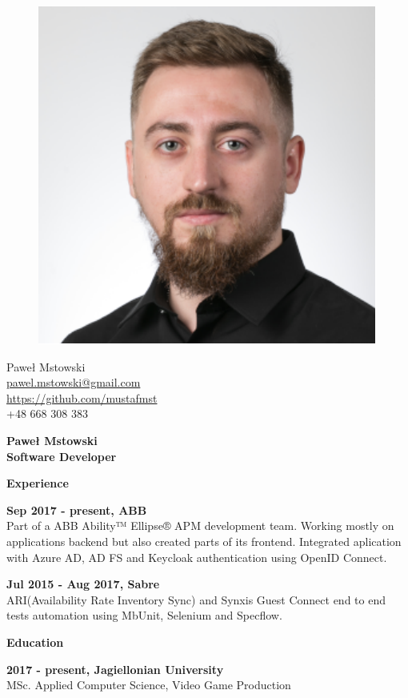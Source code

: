 \documentclass[a4paper,12pt,final]{memoir}
\newcommand{\Sep}{\vspace{1.5em}}
\newcommand{\SmallSep}{\vspace{0.5em}}
\newcommand{\CVSection}[1]
	{\Large\textbf{#1}\par
	\SmallSep\normalsize\normalfont}
\newcommand{\CVItem}[1]
	{\textbf{\color{RoyalBlue} #1}}
\begin{document}
\begin{figure}
	\hfill
	\includegraphics[width=0.6\columnwidth]{photo}
	\vspace{-7cm}
\end{figure}

\begin{flushright}\small
	Paweł Mstowski \\
	\url{pawel.mstowski@gmail.com}  \\
	\url{https://github.com/mustafmst} \\
	+48 668 308 383
\end{flushright}\normalsize
\framebreak


\Huge\bfseries {Paweł \color{RoyalBlue} Mstowski} \\
\Large\bfseries  Software Developer \\

\normalsize\normalfont

\CVSection{Experience}
\CVItem{Sep 2017 - present, ABB }\\
Part of a ABB Ability™ Ellipse® APM development team. Working mostly on applications backend but also created parts of its frontend. Integrated aplication with Azure AD, AD FS and Keycloak authentication using OpenID Connect.  
\SmallSep

\CVItem{Jul 2015 - Aug 2017, Sabre}\\
ARI(Availability Rate Inventory Sync) and Synxis Guest Connect end to end tests automation using MbUnit, Selenium and Specflow.
\Sep

\CVSection{Education}
\CVItem{2017 - present, Jagiellonian University}\\
MSc. Applied Computer Science, Video Game Production
\SmallSep
\end{document}
